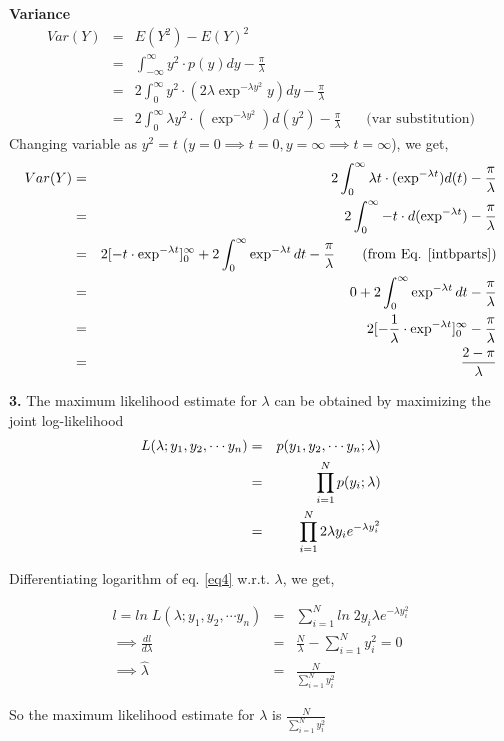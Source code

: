 \documentclass[11pt]{article}
\begin{document}
\hspace{50pt} \textbf{Variance} 
\vspace{-8pt}
\begin{eqnarray*}
 Var(Y) &=& E(Y^2)-E(Y)^2 \\ 
     &=& \int_{-\infty}^\infty y^2 \cdot p(y) dy - \frac{\pi}{\lambda} \\
     &=& 2\int_{0}^\infty y^2 \cdot (2\lambda \exp^{-\lambda y^2} y) dy - \frac{\pi}{\lambda} \\
     &=& 2\int_{0}^\infty \lambda y^2 \cdot (\exp^{-\lambda y^2}) d(y^2) - \frac{\pi}{\lambda} \; \; \; \; \: \: \: \mbox{(var substitution)}
\end{eqnarray*}
\hspace{50pt} Changing variable as $y^2 = t$ ($y = 0 \implies t = 0, y = \infty \implies t = \infty $), we get,
\begin{eqnarray*}
Var(Y) &=& 2\int_{0}^\infty \lambda t \cdot (\exp^{-\lambda t}) d(t) - \frac{\pi}{\lambda} \\
       &=& 2\int_{0}^\infty -t \cdot d(\exp^{-\lambda t}) - \frac{\pi}{\lambda} \\
     &=& 2[-t \cdot \exp^{-\lambda t}]_0^\infty + 2\int_{0}^\infty \exp^{-\lambda t} dt - \frac{\pi}{\lambda} \; \; \; \; \; \; \; \mbox{(from Eq. \ref{intbparts})} \\
     &=& 0+2\int_{0}^\infty \exp^{-\lambda t} dt - \frac{\pi}{\lambda}\\
     &=& 2[-\frac{1}{\lambda} \cdot \exp^{-\lambda t}]_0^\infty - \frac{\pi}{\lambda}\\
     &=& \frac{2-\pi}{\lambda}
\end{eqnarray*}

\par \textbf{3.}
  The maximum likelihood estimate for $\lambda$ can be obtained by maximizing the joint log-likelihood 
\vspace{-8pt}
\begin{eqnarray}
L(\lambda ; y_1, y_2, \cdots y_n) &=& p(y_1, y_2, \cdots y_n ; \lambda)\notag \\
&=& \prod_{i=1}^{N} p(y_i; \lambda) \notag \\
&=& \prod_{i=1}^{N} 2\lambda y_i e^{-\lambda y_{i}^2}
\label{eq4}
\end{eqnarray}

\hspace{10pt} Differentiating logarithm of eq. \eqref{eq4} w.r.t. $\lambda$, we get, 

\begin{eqnarray*}
l = ln \; L(\lambda ; y_1, y_2, \cdots y_n) &=& \sum\limits_{i=1}^{N} ln \; 2 y_i \lambda e^{-\lambda y_{i}^2} \\
\implies \frac{dl}{d\lambda} &=& \frac{N}{\lambda} - \sum\limits_{i=1}^{N} y_{i}^2 = 0\\
\implies \hat{\lambda} &=& \frac{N}{\sum_{i=1}^{N} y_{i}^2 }
\end{eqnarray*}

\hspace{50pt} So the maximum likelihood estimate for $\lambda$ is $\frac{N}{\sum_{i=1}^{N}  y_{i}^2}$
\end{document}
